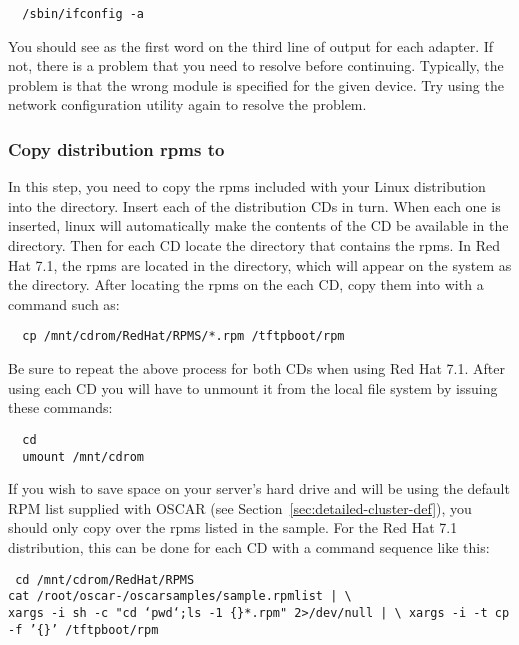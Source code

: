 \begin{verbatim}
  /sbin/ifconfig -a
\end{verbatim}
  
You should see  as the first word on the third line of output
for each adapter. If not, there is a problem that you need to resolve
before continuing. Typically, the problem is that the wrong module is
specified for the given device. Try using the network configuration
utility again to resolve the problem.
  
\subsubsection{Copy distribution rpms to }
\label{det:rpmcopy}

In this step, you need to copy the rpms included with your Linux
distribution into the  directory. 
\begchange
Insert each of the distribution CDs in turn.
When each one is inserted, linux will automatically make the
contents of the CD be available in the  directory.
Then for each CD locate the directory that contains the rpms.
In Red Hat 7.1, the rpms are located in the 
directory, which will appear on the system as the 
 directory. 
\endchange
 After locating the rpms on the each CD, copy them into
 with a command such as:

\begin{verbatim}
  cp /mnt/cdrom/RedHat/RPMS/*.rpm /tftpboot/rpm
\end{verbatim}
  
Be sure to repeat the above process for both CDs when using Red Hat
7.1.
\begchange
After using each CD you will have to unmount it from the local
file system by issuing these commands:

\begin{verbatim}
  cd
  umount /mnt/cdrom
\end{verbatim}
\endchange
If you wish to save space on your server's hard drive and will be
using the default RPM list supplied with OSCAR (see
Section~\ref{sec:detailed-cluster-def}),
you should only copy over the rpms listed in the sample.
\begchange
For the Red Hat 7.1 distribution, this can be done for each CD with
a command sequence like this:

\vspace{11pt}
{\tt
  cd /mnt/cdrom/RedHat/RPMS \\
\indent  cat /root/oscar-\oscarversion/oscarsamples/sample.rpmlist | \textbackslash \\
\indent\indent  xargs -i sh -c "cd `pwd`;ls -1 \{\}*.rpm" 2>/dev/null | \textbackslash \\
\indent\indent  xargs -i -t cp -f '\{\}' /tftpboot/rpm
}
\vspace{11pt}

